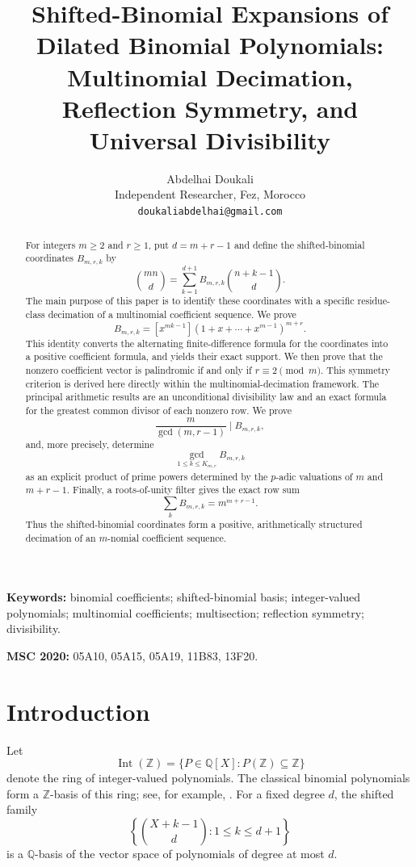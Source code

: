 \documentclass[11pt]{article}
\title{\bfseries
Shifted-Binomial Expansions of Dilated Binomial Polynomials:\\
Multinomial Decimation, Reflection Symmetry, and Universal Divisibility}
\author{Abdelhai Doukali\\
\small Independent Researcher, Fez, Morocco\\
\small \texttt{doukaliabdelhai@gmail.com}}
\date{}
\theoremstyle{definition}
\theoremstyle{remark}
\newcommand{\Z}{\mathbb Z}
\newcommand{\Q}{\mathbb Q}
\newcommand{\Int}{\operatorname{Int}}
\begin{document}
\maketitle

\begin{abstract}
For integers $m\ge2$ and $r\ge1$, put $d=m+r-1$ and define the shifted-binomial
coordinates $B_{m,r,k}$ by
\[
 \binom{mn}{d}
 =
 \sum_{k=1}^{d+1}B_{m,r,k}\binom{n+k-1}{d}.
\]
The main purpose of this paper is to identify these coordinates with a
specific residue-class decimation of a multinomial coefficient sequence. We
prove
\[
 B_{m,r,k}
 =
 [x^{mk-1}](1+x+\cdots+x^{m-1})^{m+r}.
\]
This identity converts the alternating finite-difference formula for the
coordinates into a positive coefficient formula, and yields their exact
support. We then prove that the nonzero coefficient vector is palindromic
if and only if $r\equiv2\pmod m$. This symmetry criterion is derived here directly within the
multinomial-decimation framework. The principal arithmetic results are an unconditional divisibility law and
an exact formula for the greatest common divisor of each nonzero row. We prove
\[
 \frac{m}{\gcd(m,r-1)}\mid B_{m,r,k},
\]
and, more precisely, determine
\[
 \gcd_{1\le k\le K_{m,r}} B_{m,r,k}
\]
as an explicit product of prime powers determined by the $p$-adic valuations
of $m$ and $m+r-1$. Finally, a roots-of-unity filter gives the exact row sum
\[
 \sum_k B_{m,r,k}=m^{m+r-1}.
\]
Thus the shifted-binomial coordinates form a positive, arithmetically
structured decimation of an $m$-nomial coefficient sequence.
\end{abstract}

\noindent\textbf{Keywords:}
binomial coefficients; shifted-binomial basis; integer-valued polynomials;
multinomial coefficients; multisection; reflection symmetry; divisibility.

\medskip
\noindent\textbf{MSC 2020:}
05A10, 05A15, 05A19, 11B83, 13F20.

\section{Introduction}

Let
\[
 \Int(\Z)=\{P\in\Q[X]:P(\Z)\subseteq\Z\}
\]
denote the ring of integer-valued polynomials. The classical binomial
polynomials form a $\Z$-basis of this ring; see, for example,
\cite{Polya1919,Ostrowski1919,CahenChabert1997}. For a fixed degree $d$,
the shifted family
\[
 \left\{\binom{X+k-1}{d}:1\le k\le d+1\right\}
\]
is a $\Q$-basis of the vector space of polynomials of degree at most $d$.
\end{document}
